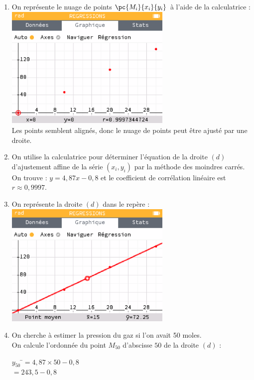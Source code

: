 \documentclass[a4paper,11pt,exos]{nsi} %
\begin{document}
\textcolor{UGLiBlue}{
    \begin{enumerate}
        \item On représente le nuage de points $\pc{M_i}{x_i}{y_i}$ à l'aide de la calculatrice :\\
        \includegraphics[width=8cm]{Ex24Sesamath.png}\\
        Les points semblent alignés, donc le nuage de points peut être ajusté par une droite.
        \item On utilise la calculatrice pour déterminer l'équation de la droite $(d)$ d'ajustement affine de la série $(x_i,y_i)$ par la méthode des moindres carrés.\\
        On trouve : $y=4,87x-0,8$ et le coefficient de corrélation linéaire est $r\approx 0,9997$.
        \item On représente la droite $(d)$ dans le repère :\\
        \includegraphics[width=8cm]{Ex24_2Sesamath.png}
        \item On cherche à estimer la pression du gaz si l'on avait 50 moles.\\
        On calcule l'ordonnée du point $M_{50}$ d'abscisse $50$ de la droite $(d)$ :
        \begin{tabbing}
            $y_{50}$    \=$=4,87\times 50-0,8$\\
            \> $=243,5-0,8$\\

\end{tabbing}
\end{enumerate}}
\end{document}
